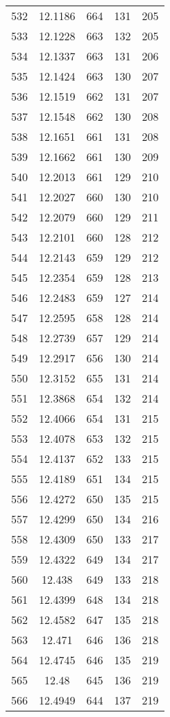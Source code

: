 \documentclass[12pt,a4paper]{article}
\begin{document}
\begin{tabular}{r|cccc}
	532 & 12.1186 & 664 & 131 & 205 \\
	533 & 12.1228 & 663 & 132 & 205 \\
	534 & 12.1337 & 663 & 131 & 206 \\
	535 & 12.1424 & 663 & 130 & 207 \\
	536 & 12.1519 & 662 & 131 & 207 \\
	537 & 12.1548 & 662 & 130 & 208 \\
	538 & 12.1651 & 661 & 131 & 208 \\
	539 & 12.1662 & 661 & 130 & 209 \\
	540 & 12.2013 & 661 & 129 & 210 \\
	541 & 12.2027 & 660 & 130 & 210 \\
	542 & 12.2079 & 660 & 129 & 211 \\
	543 & 12.2101 & 660 & 128 & 212 \\
	544 & 12.2143 & 659 & 129 & 212 \\
	545 & 12.2354 & 659 & 128 & 213 \\
	546 & 12.2483 & 659 & 127 & 214 \\
	547 & 12.2595 & 658 & 128 & 214 \\
	548 & 12.2739 & 657 & 129 & 214 \\
	549 & 12.2917 & 656 & 130 & 214 \\
	550 & 12.3152 & 655 & 131 & 214 \\
	551 & 12.3868 & 654 & 132 & 214 \\
	552 & 12.4066 & 654 & 131 & 215 \\
	553 & 12.4078 & 653 & 132 & 215 \\
	554 & 12.4137 & 652 & 133 & 215 \\
	555 & 12.4189 & 651 & 134 & 215 \\
	556 & 12.4272 & 650 & 135 & 215 \\
	557 & 12.4299 & 650 & 134 & 216 \\
	558 & 12.4309 & 650 & 133 & 217 \\
	559 & 12.4322 & 649 & 134 & 217 \\
	560 & 12.438 & 649 & 133 & 218 \\
	561 & 12.4399 & 648 & 134 & 218 \\
	562 & 12.4582 & 647 & 135 & 218 \\
	563 & 12.471 & 646 & 136 & 218 \\
	564 & 12.4745 & 646 & 135 & 219 \\
	565 & 12.48 & 645 & 136 & 219 \\
	566 & 12.4949 & 644 & 137 & 219 \\

\end{tabular}
\end{document}
